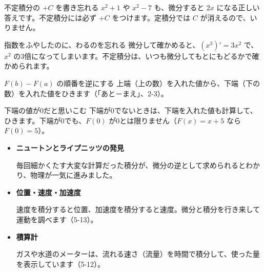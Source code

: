 
\begin{tsumazuki}{不定積分の $+C$ を書き忘れる}
$x^2+1$ や $x^2-7$ も、微分すると $2x$ になる正しい答えです。不定積分には必ず $+C$ をつけます。定積分では $C$ が消えるので、いりません。
\end{tsumazuki}

\begin{tsumazuki}{指数をふやしたのに、わるのを忘れる}
微分して確かめると、$(x^3)'=3x^2$ で、$x^2$ の3倍になってしまいます。不定積分は、いつも微分してもとにもどるかで確かめられます。
\end{tsumazuki}

\begin{tsumazuki}{$F(b)-F(a)$ の順番を逆にする}
上端（上の数）を入れた値から、下端（下の数）を入れた値をひきます（「あと－まえ」、2-3）。
\end{tsumazuki}

\begin{tsumazuki}{下端の値が0だと思いこむ}
下端が0でないときは、下端を入れた値も計算して、ひきます。下端が0でも、$F(0)$ が0とは限りません（$F(x)=x+5$ なら $F(0)=5$）。
\end{tsumazuki}

\begin{butsuri}
\begin{itemize}[leftmargin=1.2\zw, itemsep=2pt, topsep=0pt, label={\color{bkPurple}●}]
\item \textbf{ニュートンとライプニッツの発見}\par
毎回細かくたす大変な計算だった積分が、微分の逆として求められるとわかり、物理が一気に進みました。
\item \textbf{位置・速度・加速度}\par
速度を積分すると位置、加速度を積分すると速度。微分と積分を行き来して運動を調べます（5-13）。
\item \textbf{積算計}\par
ガスや水道のメーターは、流れる速さ（流量）を時間で積分して、使った量を表示しています（5-12）。
\end{itemize}
\end{butsuri}

